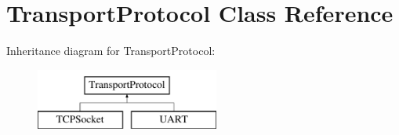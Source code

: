 \hypertarget{class_transport_protocol}{}\section{Transport\+Protocol Class Reference}
\label{class_transport_protocol}
Inheritance diagram for Transport\+Protocol\+:\begin{figure}[H]
\begin{center}
\leavevmode
\includegraphics[height=2.000000cm]{class_transport_protocol}
\end{center}
\end{figure}

